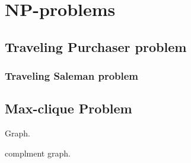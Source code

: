 \chapter{NP-problems}

\section{Traveling Purchaser problem}

\subsection{Traveling Saleman problem}

\section{Max-clique Problem}
\label{appendix:max-clique}
Graph.

complment graph.